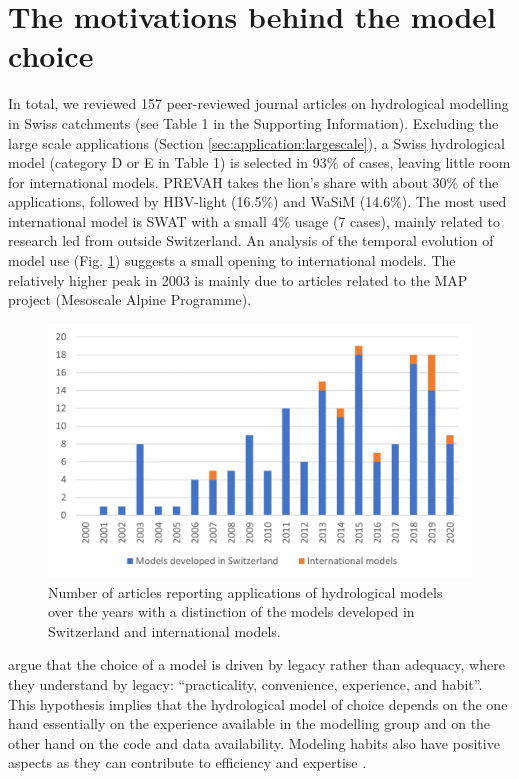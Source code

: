 \documentclass[10pt,a4paper]{article}
\begin{document}
\section{The motivations behind the model choice}
\label{sec:motivations}

In total, we reviewed 157 peer-reviewed journal articles on hydrological modelling in Swiss catchments (see Table 1 in the Supporting Information). Excluding the large scale applications (Section \ref{sec:application:largescale}), a Swiss hydrological model (category D or E in Table 1) is selected in 93\% of cases, leaving little room for international models. PREVAH takes the lion's share with about 30\% of the applications, followed by HBV-light (16.5\%) and WaSiM (14.6\%). The most used international model is SWAT with a small 4\% usage (7 cases), mainly related to research led from outside Switzerland. An analysis of the temporal evolution of model use (Fig. \ref{fig:bars}) suggests a small opening to international models. The relatively higher peak in 2003 is mainly due to articles related to the MAP project (Mesoscale Alpine Programme).

\begin{figure}[htb]
	\begin{center}
		\includegraphics[width=0.70\columnwidth]{figures/histogram.png}
		\caption{{Number of articles reporting applications of hydrological models over the years with a distinction of the models developed in Switzerland and international models. {\label{fig:bars}}
		}}
	\end{center}
\end{figure}

\citet{Addor_2019} argue that the choice of a model is driven by legacy rather than adequacy, where they understand by legacy: ``practicality, convenience, experience, and habit''. This hypothesis implies that the hydrological model of choice depends on the one hand essentially on the experience available in the modelling group and on the other hand on the code and data availability. Modeling habits also have positive aspects as they can contribute to efficiency and expertise \citep{Babel2019}.
\end{document}
